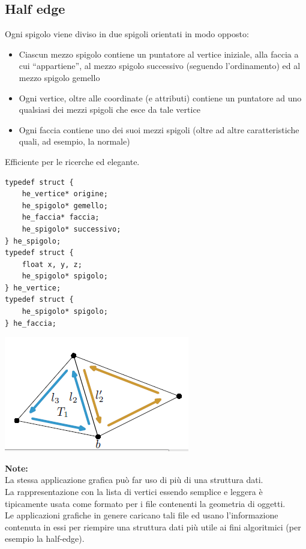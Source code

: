 \documentclass[a4paper, 10pt]{article}
\begin{document}
	\subsection{Half edge}
		Ogni spigolo viene diviso in due spigoli
		orientati in modo opposto:
		\begin{itemize}
			\item Ciascun mezzo spigolo contiene un puntatore
			al vertice iniziale, alla faccia a cui “appartiene”,
			al mezzo spigolo successivo (seguendo
			l’ordinamento) ed al mezzo spigolo gemello
			\item Ogni vertice, oltre alle coordinate (e attributi)
			contiene un puntatore ad uno qualsiasi dei
			mezzi spigoli che esce da tale vertice
			\item Ogni faccia contiene uno dei suoi mezzi spigoli
			(oltre ad altre caratteristiche quali, ad
			esempio, la normale)
		\end{itemize}
		Efficiente per le ricerche ed elegante.
		
		\begin{multicols}{2}		
	\begin{lstlisting}
typedef struct {
	he_vertice* origine;
	he_spigolo* gemello;
	he_faccia* faccia;
	he_spigolo* successivo;
} he_spigolo;
typedef struct {
	float x, y, z;
	he_spigolo* spigolo;
} he_vertice;
typedef struct {
	he_spigolo* spigolo;
} he_faccia;
	\end{lstlisting}
		
		\columnbreak
		
		\vspace*{1cm}
		\includegraphics[scale=0.5]{mesh2}
	\end{multicols}
		
	\noindent
	\textbf{Note:}\\
	La stessa applicazione grafica può far uso di più di una
	struttura dati.\\
	La rappresentazione con la lista di vertici essendo semplice e
	leggera è tipicamente usata come formato per i file
	contenenti la geometria di oggetti.\\
	Le applicazioni grafiche in genere caricano tali file ed usano
	l’informazione contenuta in essi per riempire una struttura
	dati più utile ai fini algoritmici (per esempio la half-edge).
	
\end{document}
